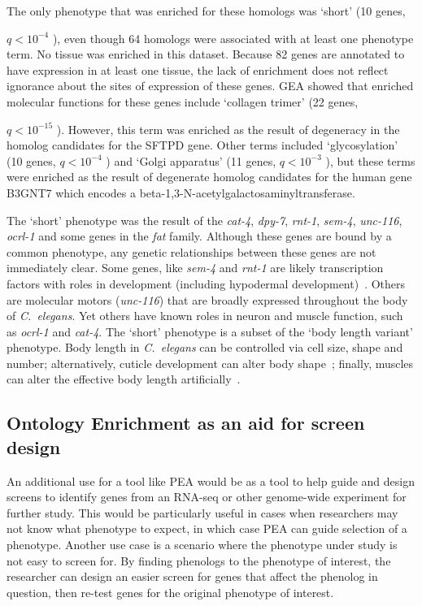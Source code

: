\documentclass[10pt,letterpaper,twocolumn]{article}
\newcommand{\cel}{\emph{C.~elegans}}
\newcommand{\qval}[1]{
                      \ensuremath{
                                  q<10^{-#1}
                                  }
                      }
\begin{document}
The only phenotype that was enriched for these homologs was `short' (10 genes,
\qval{4}), even though 64 homologs were associated with at least
one phenotype term. No tissue was enriched in this dataset. Because
82 genes are annotated to have expression in at least one tissue, the lack of
enrichment does not reflect ignorance about the sites of expression of these
genes. GEA showed that enriched
molecular functions for these genes include `collagen trimer' (22 genes,
\qval{15}). However, this term was enriched as the result of degeneracy in the
homolog candidates for the SFTPD gene. Other terms included
 `glycosylation' (10 genes, \qval{4}) and `Golgi apparatus' (11
genes, \qval{3}), but these terms were enriched as the result of degenerate homolog
candidates for the human gene B3GNT7 which encodes a
beta-1,3-N-acetylgalactosaminyltransferase.

The `short' phenotype was the result of the \emph{cat-4}, \emph{dpy-7},
\emph{rnt-1}, \emph{sem-4}, \emph{unc-116}, \emph{ocrl-1} and some genes in the
\emph{fat} family. Although these genes are bound by a common phenotype, any
genetic relationships between these genes are not immediately clear. Some genes,
like \emph{sem-4} and \emph{rnt-1} are likely transcription factors with roles
in development (including hypodermal development)~\cite{Desai1988,Ji2004}.
Others are molecular motors (\emph{unc-116}) that are broadly expressed throughout
the body of \cel{}. Yet others have known roles in neuron and muscle function,
such as \emph{ocrl-1} and \emph{cat-4}. The `short' phenotype is a subset of
the `body length variant' phenotype. Body length in \cel{} can be controlled via
cell size, shape and number\cite{}; alternatively, cuticle development can alter body
shape~\cite{}; finally, muscles can alter the effective body length artificially~\cite{}.



\subsection*{Ontology Enrichment as an aid for screen design}
An additional use for a tool like PEA would be as a tool to help guide and
design screens to identify genes from an RNA-seq or other genome-wide experiment
for further study. This would be particularly useful in cases when researchers
may not know what phenotype to expect, in which case PEA can guide selection of
a phenotype. Another use case is a scenario where the phenotype under study is
not easy to screen for. By finding phenologs to the phenotype of interest, the
researcher can design an easier screen for genes that affect the phenolog in
question, then re-test genes for the original phenotype of interest.
\end{document}
